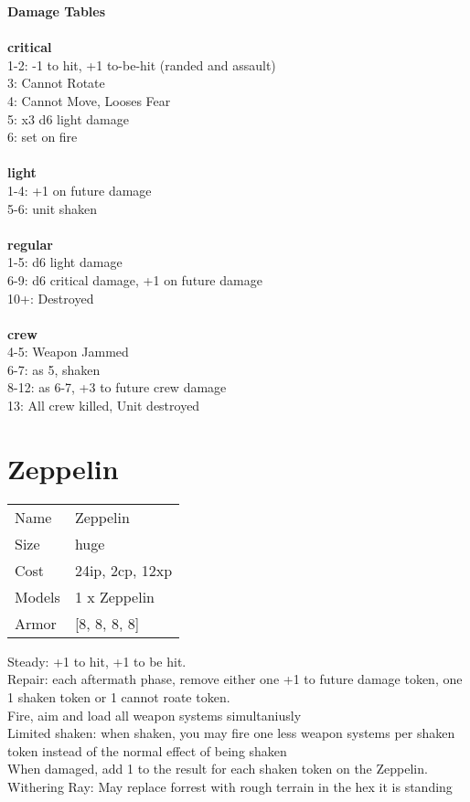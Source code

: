 {\bf Damage Tables} \\
\ \\ {\bf critical } \\
1-2: -1 to hit, +1 to-be-hit (randed and assault) \\
3: Cannot Rotate \\
4: Cannot Move, Looses Fear \\
5: x3 d6 light damage \\
6: set on fire \\
\ \\ {\bf light } \\
1-4: +1 on future damage \\
5-6: unit shaken \\
\ \\ {\bf regular } \\
1-5: d6 light damage \\
6-9: d6 critical damage, +1 on future damage \\
10+: Destroyed \\
\ \\ {\bf crew } \\
4-5: Weapon Jammed \\
6-7: as 5, shaken \\
8-12: as 6-7, +3 to future crew damage \\
13: All crew killed, Unit destroyed \\










\pagebreak\pagebreak

\section{ Zeppelin }

\begin{tabular}{ll}
  Name & Zeppelin \\
  Size & huge\\
  Cost & 24ip, 2cp, 12xp\\
  Models & 1 x Zeppelin\\
  Armor & [8, 8, 8, 8]\\
\end{tabular}

\noindent Steady: +1 to hit, +1 to be hit.\\ 
Repair: each aftermath phase, remove either one +1 to future damage token, one 1 shaken token or 1 cannot roate token.\\ 
Fire, aim and load all weapon systems simultaniusly\\ 
Limited shaken: when shaken, you may fire one less weapon systems per shaken token instead of the normal effect of being shaken\\ 
 When damaged, add 1 to the result for each shaken token on the Zeppelin.\\ 
Withering Ray: May replace forrest with rough terrain in the hex it is standing\\ 


